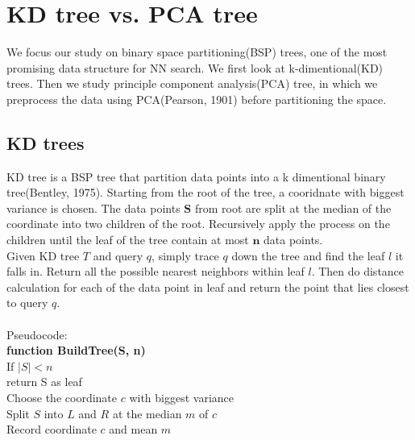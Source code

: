 \documentclass[paper=letter, fontsize=12pt]{article} %
\begin{document}
\section{KD tree vs. PCA tree}
We focus our study on binary space partitioning(BSP) trees, one of the most promising data structure for NN search. We first look at k-dimentional(KD) trees. Then we study principle component analysis(PCA) tree, in which we preprocess the data using PCA(Pearson, 1901) before partitioning the space.


\subsection{KD trees}
KD tree is a BSP tree that partition data points into a k dimentional binary tree(Bentley, 1975). Starting from the root of the tree, a cooridnate with biggest variance is chosen. The data points $\mathbf S$ from root are split at the median of the coordinate into two children of the root. Recursively apply the process on the children until the leaf of the tree contain at most $\mathbf n$ data points.\\
\hspace*{2em} Given KD tree $T$ and query $q$, simply trace $q$ down the tree and find the leaf $l$ it falls in. Return all the possible nearest neighbors within leaf $l$. Then do distance calculation for each of the data point in leaf and return the point that lies closest to query $q$.
\\~\\
Pseudocode:\\
\hspace*{1em} \textbf{function BuildTree(S, n)}\\
\hspace*{2em} If $|S| < n$\\
\hspace*{3em} return S as leaf\\
\hspace*{2em} Choose the coordinate $c$ with biggest variance\\
\hspace*{2em} Split $S$ into $L$ and $R$ at the median $m$ of $c$\\
\hspace*{2em} Record coordinate $c$ and mean $m$\\
\end{document}
